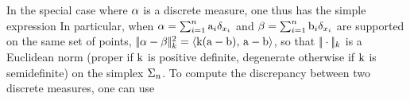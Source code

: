 In the special case where $\alpha$ is a discrete measure, one thus has the simple expression
In particular, when $\alpha=\sum_{i=1}^n \mathrm{a}_i \delta_{x_i}$ and $\beta=\sum_{i=1}^n \mathrm{b}_i \delta_{x_i}$ are supported on the same set of points, $|\!| \alpha-\beta |\!|_{k}^2 = \langle \mathrm{k}(\mathrm{a}-\mathrm{b}),\,\mathrm{a}-\mathrm{b}\rangle$, so that $|\!| \cdot |\!|_{k}$ is a Euclidean norm (proper if $\mathrm{k}$ is positive definite, degenerate otherwise if $\mathrm{k}$ is semidefinite) on the simplex $\Sigma_n$.
%
To compute the discrepancy between two discrete measures, one can use









